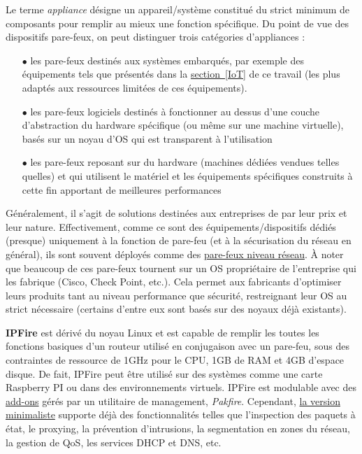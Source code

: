 \documentclass[]{article}
\newcommand{\minit}[1]{\noindent{\small\textbf{ \underline{#1}}}\vspace{0.2cm}}
\newcommand{\wordlink}[2]{\hyperref[#1]{#2~\ref{#1}}}
\begin{document}
Le terme \textit{appliance} désigne un appareil/système constitué du strict minimum de composants pour remplir au mieux une fonction spécifique. Du point de vue des dispositifs pare-feux, on peut distinguer trois catégories d'appliances :
\begin{itemize}
\vspace{0.2cm}
\item[$\bullet$] les pare-feux destinés aux systèmes embarqués, par exemple des équipements tels que présentés dans la \wordlink{IoT}{section} de ce travail (les plus adaptés aux ressources limitées de ces équipements). 
\vspace{0.2cm}
\item[$\bullet$] les pare-feux logiciels destinés à fonctionner au dessus d'une couche d'abstraction du hardware spécifique (ou même sur une machine virtuelle), basés sur un noyau d'OS qui est transparent à l'utilisation
\vspace{0.2cm}
\item[$\bullet$] les pare-feux reposant sur du hardware (machines dédiées vendues telles quelles) et qui utilisent le matériel et les équipements spécifiques construits à cette fin apportant de meilleures performances
\end{itemize}
\vspace{0.2cm}

\par Généralement, il s'agit de solutions destinées aux entreprises de par leur prix et leur nature. Effectivement, comme ce sont des équipements/dispositifs dédiés (presque) uniquement à la fonction de pare-feu (et à la sécurisation du réseau en général), ils sont souvent déployés comme des \hyperref[netw_fw]{pare-feux niveau réseau}. À noter que beaucoup de ces pare-feux tournent sur un OS propriétaire de l'entreprise qui les fabrique (Cisco, Check Point, etc.). Cela permet aux fabricants d'optimiser leurs produits tant au niveau performance que sécurité, restreignant leur OS au strict nécessaire (certains d'entre eux sont basés sur des noyaux déjà existants).\\

\minit{Appliances sur systèmes embarqués}

\par \textbf{IPFire} est dérivé du noyau Linux et est capable de remplir les toutes les fonctions basiques d'un routeur utilisé en conjugaison avec un pare-feu, sous des contraintes de ressource de 1GHz pour le CPU, 1GB de RAM et 4GB d'espace disque. De fait, IPFire peut être utilisé sur des systèmes comme une carte Raspberry PI ou dans des environnements virtuels. IPFire est modulable avec des \href{https://wiki.ipfire.org/addons/start}{add-ons} gérés par un utilitaire de management, \textit{Pakfire}. Cependant, \href{https://www.ipfire.org/features}{la version minimaliste} supporte déjà des fonctionnalités telles que l'inspection des paquets à état, le proxying, la prévention d'intrusions, la segmentation en zones du réseau, la gestion de QoS, les services DHCP et DNS, etc.\\
\end{document}
